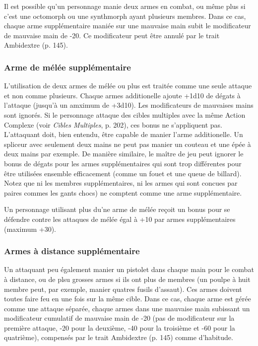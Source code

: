 Il est possible qu'un personnage manie deux armes en combat, ou même plus si c'est une octomorph ou une synthmorph ayant plusieurs membres. Dans ce cas, chaque arme supplémentaire maniée sur une mauvaise main subit le modificateur de mauvaise main de -20. Ce modificateur peut être annulé par le trait Ambidextre (p. 145). 

\subsubsection{Arme de mélée supplémentaire} 

L'utilisation de deux armes de mélée ou plus est traitée comme une seule attaque et non comme plusieurs. Chaque armes additionelle ajoute +1d10 de dégats à l'attaque (jusqu'à un amximum de +3d10). Les modificateurs de mauvaises mains sont ignorés. Si le personnage attaque des cibles multiples avec la même Action Complexe (voir \emph{Cibles Multiples}, p. 202), ces bonus ne s'appliquent pas. L'attaquant doit, bien entendu, être capable de manier l'arme additionelle. Un spliceur avec seulement deux mains ne peut pas manier un couteau et une épée à deux mains par exemple. De manière similaire, le maître de jeu peut ignorer le bonus de dégats pour les armes supplémentaires qui sont trop différentes pour être utilisées ensemble efficacement (comme un fouet et une queue de billard). Notez que ni les membres supplémentaires, ni les armes qui sont concues par paires commes les gants chocs) ne comptent comme une arme supplémentaire.  

Un personnage utilisant plus du'ne arme de mélée reçoit un bonus pour se défendre contre les attaques de mélée égal à +10 par armes supplémentaires (maximum +30). 

\subsubsection{Armes à distance supplémentaire} 

Un attaquant peu également manier un pistolet dans chaque main pour le combat à distance, ou de plsu grosses armes si ils ont plus de membres (un poulpe à huit membre peut, par exemple, manier quatres fusils d'assaut). Ces armes doivent toutes faire feu en une fois sur la même cible. Dans ce cas, chaque arme est gérée comme une attaque séparée, chaque armes dans une mauvaise main subissant un modificateur cumulatif de mauvaise main de -20 (pas de modificateur sur la première attaque, -20 pour la deuxième, -40 pour la troisième et -60 pour la quatrième), compensés par le trait Ambidextre (p. 145) comme d'habitude. 

